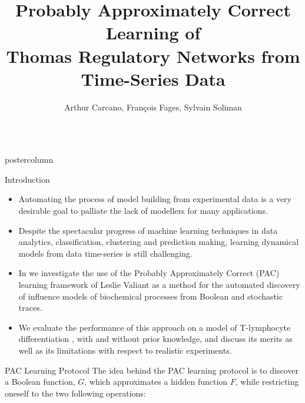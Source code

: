 \documentclass[final,hyperref={pdfpagelabels=false},xcolor=dvipsnames]{beamer}
\title{Probably Approximately Correct Learning of\\ Thomas Regulatory Networks from Time-Series Data}
\author{Arthur Carcano, Fran\c{c}ois Fages, Sylvain Soliman}
\institute[Inria, Universit\'e Paris Saclay]{EP Lifeware, Inria, Universit\'e Paris Saclay, France}
\newlength{\columnheight}
\begin{document}
\begin{frame}[fragile]
  \begin{columns}
    \begin{column}{.49\textwidth}
      \begin{beamercolorbox}[center,wd=\textwidth]{postercolumn}
        \begin{minipage}[T]{.95\textwidth}  %
          \parbox[t][\columnheight]{\textwidth}{ %
            \begin{block}{Introduction}
              \begin{itemize}
              \item Automating the process of model building from experimental data 
is a very desirable goal to palliate the lack of modellers for many applications.
\item Despite the spectacular progress of machine learning techniques in data analytics, classification, clustering and prediction making,
learning dynamical models from data time-series is still challenging.
\item In \cite{CFS17cmsb} we investigate the use of the Probably Approximately Correct (PAC) learning 
framework of Leslie Valiant \cite{Valiant84cacm} as a method for the automated discovery of influence models of biochemical processes from Boolean and stochastic traces. 
\item We evaluate the performance of this approach on a model of T-lymphocyte
differentiation \cite{RRMTC06tcsb,Mendoza06biosystems}, with and without prior knowledge,
and discuss its merits as well as its limitations with respect to realistic experiments.
              \end{itemize}              
            \end{block}
            \vfill
            \begin{block}{PAC Learning Protocol}
The idea behind the PAC learning protocol is to discover a Boolean
function, $G$, which approximates a hidden function $F$, while restricting oneself to the two following operations:
\begin{itemize}

\end{itemize}
\end{block}}
\end{minipage}
\end{beamercolorbox}
\end{column}
\end{columns}
\end{frame}
\end{document}
